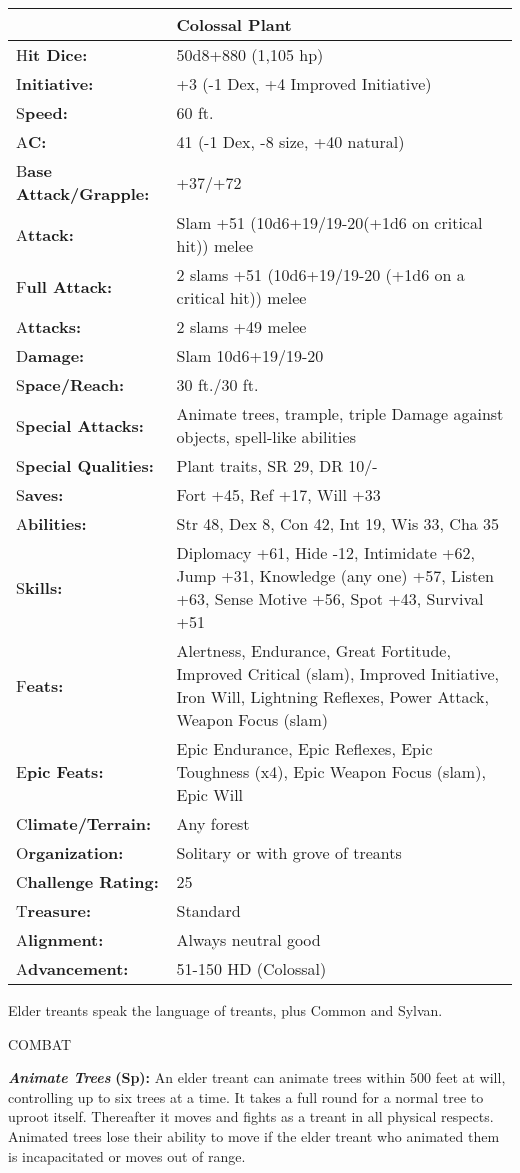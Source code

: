 \documentclass{article}
\begin{document}
{\begin{tabular}{|>{\raggedright}p{65pt}|>{\raggedright}p{260pt}|}
\hline
  & Colossal Plant\tabularnewline
\hline
H\textbf{it Dice:} & 50d8+880 (1,105 hp) \tabularnewline
\hline
I\textbf{nitiative:} & +3 (-1 Dex, +4 Improved Initiative) \tabularnewline
\hline
S\textbf{peed:} & 60 ft. \tabularnewline
\hline
A\textbf{C:} & 41 (-1 Dex, -8 size, +40 natural) \tabularnewline
\hline
B\textbf{ase Attack/Grapple:} & +37/+72\tabularnewline
\hline
A\textbf{ttack:} & Slam +51 (10d6+19/19-20(+1d6 on critical hit)) melee\tabularnewline
\hline
F\textbf{ull Attack:} & 2 slams +51 (10d6+19/19-20 (+1d6 on a critical hit)) melee\tabularnewline
\hline
A\textbf{ttacks:} & 2 slams +49 melee \tabularnewline
\hline
D\textbf{amage:} & Slam 10d6+19/19-20 \tabularnewline
\hline
S\textbf{pace/Reach:} & 30 ft./30 ft. \tabularnewline
\hline
S\textbf{pecial Attacks:} & Animate trees, trample, triple Damage against objects, 
spell-like abilities \tabularnewline
\hline
S\textbf{pecial Qualities:} & Plant traits, SR 29, DR 10/- \tabularnewline
\hline
S\textbf{aves:} & Fort +45, Ref +17, Will +33 \tabularnewline
\hline
A\textbf{bilities:} & Str 48, Dex 8, Con 42, Int 19, Wis 33, Cha 35 \tabularnewline
\hline
S\textbf{kills:} & Diplomacy +61, Hide -12, Intimidate +62, Jump +31, Knowledge 
(any one) +57, Listen +63, Sense Motive +56, Spot +43, Survival +51\tabularnewline
\hline
F\textbf{eats:} & Alertness, Endurance, Great Fortitude, Improved Critical (slam), 
Improved Initiative, Iron Will, Lightning Reflexes, Power Attack, Weapon Focus 
(slam) \tabularnewline
\hline
E\textbf{pic Feats:} & Epic Endurance, Epic Reflexes, Epic Toughness (x4), Epic 
Weapon Focus (slam), Epic Will \tabularnewline
\hline
C\textbf{limate/Terrain:} & Any forest \tabularnewline
\hline
O\textbf{rganization:} & Solitary or with grove of treants \tabularnewline
\hline
C\textbf{hallenge Rating:} & 25 \tabularnewline
\hline
T\textbf{reasure:} & Standard \tabularnewline
\hline
A\textbf{lignment:} & Always neutral good \tabularnewline
\hline
A\textbf{dvancement:} & 51-150 HD (Colossal) \tabularnewline
\hline
\end{tabular}

Elder treants speak the language of treants, plus Common and Sylvan. 

COMBAT 

\textit{\textbf{Animate Trees }}\textbf{(Sp):} An elder treant can animate trees 
within 500 feet at will, controlling up to six trees at a time. It takes a full 
round for a normal tree to uproot itself. Thereafter it moves and fights as a treant 
in all physical respects. Animated trees lose their ability to move if the elder 
treant who animated them is incapacitated or moves out of range. 

}
\end{document}

